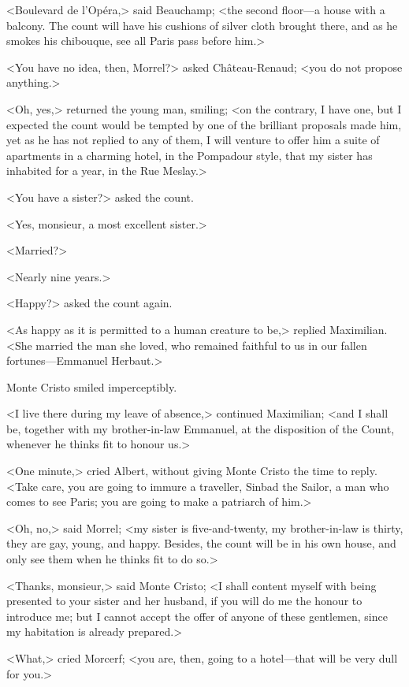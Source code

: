  <Boulevard de l'Opéra,> said Beauchamp; <the second floor—a house with a balcony. The count will have his cushions of silver cloth brought there, and as he smokes his chibouque, see all Paris pass before him.> 

 <You have no idea, then, Morrel?> asked Château-Renaud; <you do not propose anything.> 

 <Oh, yes,> returned the young man, smiling; <on the contrary, I have one, but I expected the count would be tempted by one of the brilliant proposals made him, yet as he has not replied to any of them, I will venture to offer him a suite of apartments in a charming hotel, in the Pompadour style, that my sister has inhabited for a year, in the Rue Meslay.> 

 <You have a sister?> asked the count. 

 <Yes, monsieur, a most excellent sister.> 

 <Married?> 

 <Nearly nine years.> 

 <Happy?> asked the count again. 

 <As happy as it is permitted to a human creature to be,> replied Maximilian. <She married the man she loved, who remained faithful to us in our fallen fortunes—Emmanuel Herbaut.> 

 Monte Cristo smiled imperceptibly. 

 <I live there during my leave of absence,> continued Maximilian; <and I shall be, together with my brother-in-law Emmanuel, at the disposition of the Count, whenever he thinks fit to honour us.> 

 <One minute,> cried Albert, without giving Monte Cristo the time to reply. <Take care, you are going to immure a traveller, Sinbad the Sailor, a man who comes to see Paris; you are going to make a patriarch of him.>

<Oh, no,> said Morrel; <my sister is five-and-twenty, my brother-in-law is thirty, they are gay, young, and happy. Besides, the count will be in his own house, and only see them when he thinks fit to do so.> 

 <Thanks, monsieur,> said Monte Cristo; <I shall content myself with being presented to your sister and her husband, if you will do me the honour to introduce me; but I cannot accept the offer of anyone of these gentlemen, since my habitation is already prepared.> 

 <What,> cried Morcerf; <you are, then, going to a hotel—that will be very dull for you.> 


